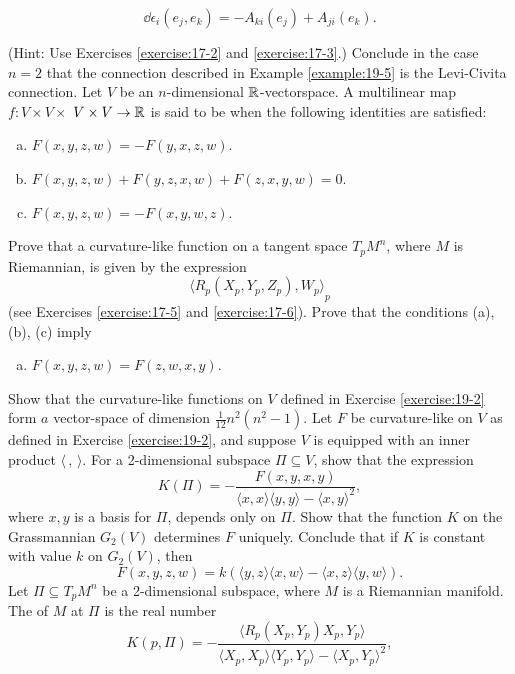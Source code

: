 \begin{enumerate}[\theexercise.1]
    \[
      \dd{\epsilon }_{i}( {{e}_{j},{e}_{k}})  = - {A}_{ki}( {e}_{j})  + {A}_{ji}( {e}_{k}).
    \]
    \par(Hint: Use Exercises \ref{exercise:17-2} and \ref{exercise:17-3}.)
    Conclude in the case $n = 2$ that the connection described in Example \ref{example:19-5} is the Levi-Civita connection.
  \NewItem Let $V$ be an $n$-dimensional $\mathbb{R}$-vectorspace. A multilinear map $f\colon V \times  V \times$  $V \times  V \rightarrow  \mathbb{R}$ is said to be  when the following identities are satisfied:
    \begin{enumerate}[(a)]
      \item $F( {x,y,z,w})  = - F( {y,x,z,w})$.
      \item $F( {x,y,z,w})  + F( {y,z,x,w})  + F( {z,x,y,w})  = 0$.
      \item $F( {x,y,z,w})  = - F( {x,y,w,z})$.
    \end{enumerate}
    Prove that a curvature-like function on a tangent space ${T}_{p}{M}^{n}$, where $M$ is Riemannian, is given by the expression
    \[
      {\langle  {R}_{p}( {X}_{p},{Y}_{p},{Z}_{p}),{W}_{p}\rangle  }_{p}
    \]
    (see Exercises \ref{exercise:17-5} and \ref{exercise:17-6}). Prove that the conditions (a), (b), (c) imply
    \begin{enumerate}[(d)]
      \item $F( {x,y,z,w})  = F( {z,w,x,y})$.
    \end{enumerate}
  \NewItem Show that the curvature-like functions on $V$ defined in Exercise \ref{exercise:19-2} form $a$ vector-space of dimension $\frac{1}{12}{n}^{2}( {{n}^{2}- 1}).$
  \NewItem Let $F$ be curvature-like on $V$ as defined in Exercise \ref{exercise:19-2}, and suppose $V$ is equipped with an inner product $\langle\,, \,\rangle$. For a 2-dimensional subspace $\Pi  \subseteq  V$, show that the expression
    \[
      K( \Pi )  = - \frac{F( {x,y,x,y}) }{\langle x,x\rangle \langle y,y\rangle-\langle x,y{\rangle }^{2}},
    \]
    where $x,y$ is a basis for $\Pi$, depends only on $\Pi$. Show that the function $K$ on the Grassmannian ${G}_{2}( V)$ determines $F$ uniquely. Conclude that if $K$ is constant with value $k$ on ${G}_{2}( V)$, then
    \[
      F( {x,y,z,w})  = k( {\langle y,z\rangle \langle x,w\rangle-\langle x,z\rangle \langle y,w\rangle }).
    \]
  \NewItem Let $\Pi \subseteq  {T}_{p}{M}^{n}$ be a 2-dimensional subspace, where $M$ is a Riemannian manifold. The  of $M$ at $\Pi$ is the real number
    \[
      K( {p,\Pi })  = - \frac{\langle  {R}_{p}( {X}_{p},{Y}_{p}) {X}_{p},{Y}_{p}\rangle  }{\langle  {{X}_{p},{X}_{p}}\rangle  \langle  {{Y}_{p},{Y}_{p}}\rangle  - {\langle  {X}_{p},{Y}_{p}\rangle  }^{2}},
\]
\end{enumerate}
